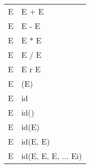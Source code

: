 \documentclass{article}
\begin{document}
\begin{table}[]
\begin{tabular}{l|l}
E & E + E               \\
E & E - E               \\
E & E * E               \\
E & E / E               \\
E & E r E               \\
E & (E)                 \\
E & id                  \\
E & id()                \\
E & id(E)               \\
E & id(E, E)            \\
E & id(E, E, E, ... Ei)
\end{tabular}
\end{table}
\end{document}
